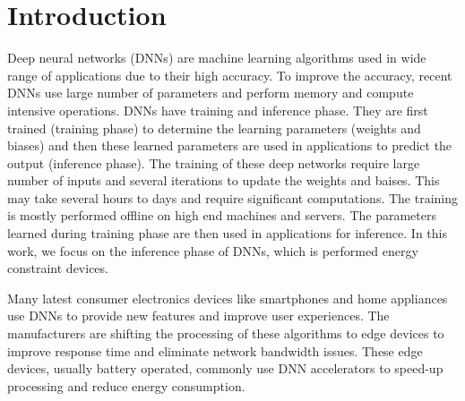 \documentclass[a4paper,10pt]{article}
\begin{document}

\section{Introduction}
Deep neural networks (DNNs) are machine learning algorithms used in wide range of applications due to their high accuracy. To improve the accuracy, recent DNNs use large number of parameters and perform memory and compute intensive operations. 
DNNs have training and inference phase. They are first trained (training phase) to determine the learning parameters (weights and biases) and then these learned parameters are used in applications to predict the output (inference phase). The training of these deep networks require large number of inputs and several iterations to update the weights and baises. This may take several hours to days and require significant computations. The training is mostly performed offline on high end machines and servers. The parameters learned during training phase are then used in applications for inference. In this work, we focus on the inference phase of DNNs, which is performed energy constraint devices.

Many latest consumer electronics devices like smartphones and home appliances use DNNs to provide new features and improve user experiences. The manufacturers are shifting the processing of these algorithms to edge devices to improve response time and eliminate network bandwidth issues. These edge devices, usually battery operated, commonly use DNN accelerators to speed-up processing and reduce energy consumption. 
\end{document}
